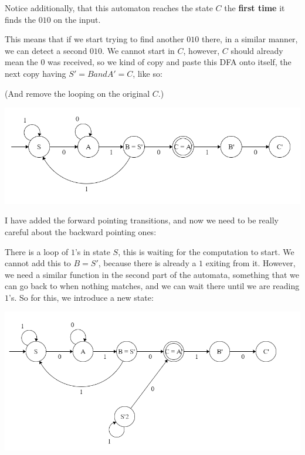 Notice additionally, that this automaton reaches the state $C$ the \textbf{first time} it finds the $010$ on the input.

This means that if we start trying to find another $010$ there, in a similar manner, we can detect a second $010$. We cannot start in $C$, however, $C$ should already mean the $0$ was received, so we kind of copy and paste this DFA onto itself, the next copy having $S' = B and A' = C$, like so:

(And remove the looping on the original $C$.)

\begin{center}
    \includegraphics[width=\linewidth]{./exams/2019_01_06/01/step_2.png}
\end{center}

I have added the forward pointing transitions, and now we need to be really careful about the backward pointing ones:

There is a loop of $1$'s in state $S$, this is waiting for the computation to start. We cannot add this to $B=S'$, because there is already a $1$ exiting from it. However, we need a similar function in the second part of the automata, something that we can go back to when nothing matches, and we can wait there until we are reading $1$'s. So for this, we introduce a new state:

\begin{center}
    \includegraphics[width=\linewidth]{./exams/2019_01_06/01/step_3.png}
\end{center}

